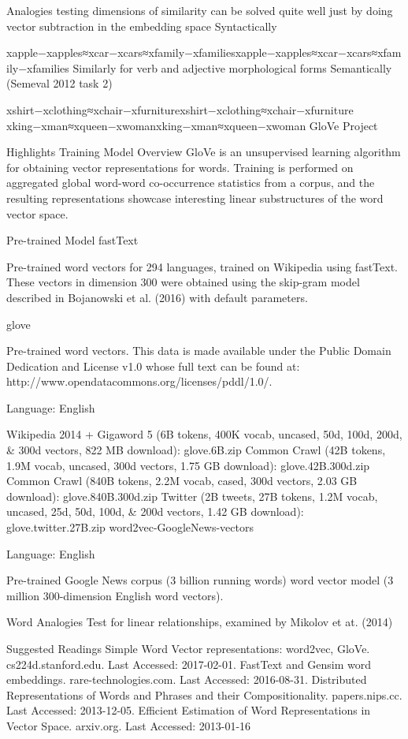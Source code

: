 Analogies testing dimensions of similarity can be solved quite well just by doing vector subtraction in the embedding space
Syntactically

xapple−xapples≈xcar−xcars≈xfamily−xfamiliesxapple−xapples≈xcar−xcars≈xfamily−xfamilies
Similarly for verb and adjective morphological forms
Semantically (Semeval 2012 task 2)

xshirt−xclothing≈xchair−xfurniturexshirt−xclothing≈xchair−xfurniture
xking−xman≈xqueen−xwomanxking−xman≈xqueen−xwoman
GloVe
Project

Highlights
Training
Model Overview
GloVe is an unsupervised learning algorithm for obtaining vector representations for words. Training is performed on aggregated global word-word co-occurrence statistics from a corpus, and the resulting representations showcase interesting linear substructures of the word vector space.

Pre-trained Model
fastText

Pre-trained word vectors for 294 languages, trained on Wikipedia using fastText. These vectors in dimension 300 were obtained using the skip-gram model described in Bojanowski et al. (2016) with default parameters.

glove

Pre-trained word vectors. This data is made available under the Public Domain Dedication and License v1.0 whose full text can be found at: http://www.opendatacommons.org/licenses/pddl/1.0/.

Language: English

Wikipedia 2014 + Gigaword 5 (6B tokens, 400K vocab, uncased, 50d, 100d, 200d, & 300d vectors, 822 MB download): glove.6B.zip
Common Crawl (42B tokens, 1.9M vocab, uncased, 300d vectors, 1.75 GB download): glove.42B.300d.zip
Common Crawl (840B tokens, 2.2M vocab, cased, 300d vectors, 2.03 GB download): glove.840B.300d.zip
Twitter (2B tweets, 27B tokens, 1.2M vocab, uncased, 25d, 50d, 100d, & 200d vectors, 1.42 GB download): glove.twitter.27B.zip
word2vec-GoogleNews-vectors

Language: English

Pre-trained Google News corpus (3 billion running words) word vector model (3 million 300-dimension English word vectors).

Word Analogies
Test for linear relationships, examined by Mikolov et at. (2014)

Suggested Readings
Simple Word Vector representations: word2vec, GloVe. cs224d.stanford.edu. Last Accessed: 2017-02-01.
FastText and Gensim word embeddings. rare-technologies.com. Last Accessed: 2016-08-31.
Distributed Representations of Words and Phrases and their Compositionality. papers.nips.cc. Last Accessed: 2013-12-05.
Efficient Estimation of Word Representations in Vector Space. arxiv.org. Last Accessed: 2013-01-16

